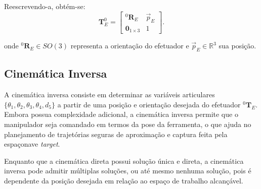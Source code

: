 Reescrevendo-a, obtém-se:
\begin{equation}
\mathbf{T}^{0}_{E} =
\begin{bmatrix}
{}^{0}\!\mathbf{R}_{E} & \vec{p}_E \\
\mathbf{0}_{1\times 3} & 1
\end{bmatrix}.
\end{equation}

onde ${}^0 \mathbf{R}_{E} \in SO(3)$ representa a orientação do efetuador e $\vec{p}_E \in \mathbb{R}^3$ sua posição.

\subsection{Cinemática Inversa}

A cinemática inversa consiste em determinar as variáveis articulares 
$\{ \theta_1, \theta_2, \theta_3, \theta_4, d_5 \}$ 
a partir de uma posição e orientação desejada do efetuador
${}^0 \mathbf{T}_E$.
Embora possua complexidade adicional, a cinemática inversa permite que o manipulador seja comandado em termos da pose da ferramenta, o que ajuda no planejamento de trajetórias seguras de aproximação e captura feita pela espaçonave \emph{target}. 

Enquanto que a cinemática direta possui solução única e direta, a cinemática inversa pode admitir múltiplas soluções, ou até mesmo nenhuma solução, pois é dependente da posição desejada em relação ao espaço de trabalho alcançável. 

